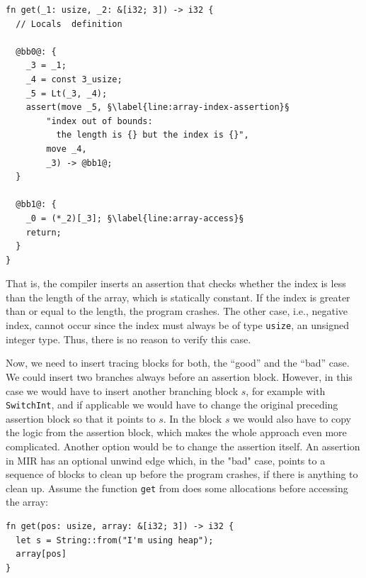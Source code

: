 \documentclass[paper=a4,%
  twoside,%
  BCOR4mm,%
  abstract=true,%
  toc=bibliography,%
  chapterprefix=true,%
  toc=bibliographynumbered,%
  open=right,%
  english,%
  pagesize=pdftex]{scrreprt}
\newcommand{\mir}{\ac{MIR}\xspace}
\begin{document}
\begin{lstlisting}[language={MIR}, style=boxed, escapechar=§, caption={The compiler inserts runtime assertions at places where arrays are accessed by index}, label=lst:mir-boundary-check]
fn get(_1: usize, _2: &[i32; 3]) -> i32 {
  // Locals  definition

  @bb0@: {
    _3 = _1;
    _4 = const 3_usize;
    _5 = Lt(_3, _4);
    assert(move _5, §\label{line:array-index-assertion}§
        "index out of bounds:
          the length is {} but the index is {}",
        move _4,
        _3) -> @bb1@;
  }

  @bb1@: {
    _0 = (*_2)[_3]; §\label{line:array-access}§
    return;
  }
}
\end{lstlisting}

That is, the compiler inserts an assertion that checks whether the index is less than the length of the array, which is statically constant. If the index is greater than or equal to the length, the program crashes. The other case, i.e., negative index, cannot occur since the index must always be of type \texttt{usize}, an unsigned integer type. Thus, there is no reason to verify this case.

Now, we need to insert tracing blocks for both, the ``good'' and the ``bad'' case. We could insert two branches always before an assertion block. However, in this case we would have to insert another branching block $s$, for example with \texttt{SwitchInt}, and if applicable we would have to change the original preceding assertion block so that it points to $s$. In the block $s$ we would also have to copy the logic from the assertion block, which makes the whole approach even more complicated. Another option would be to change the assertion itself. An assertion in \mir has an optional unwind edge which, in the "bad" case, points to a sequence of blocks to clean up before the program crashes, if there is anything to clean up. Assume the function \texttt{get} from  does some allocations before accessing the array:
\begin{lstlisting}[style=boxed, caption={}]
fn get(pos: usize, array: &[i32; 3]) -> i32 {
  let s = String::from("I'm using heap");
  array[pos]
}
\end{lstlisting}
\end{document}
